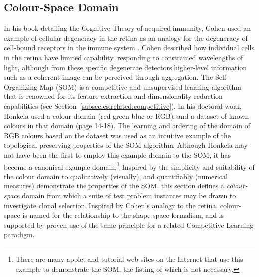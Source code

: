 \subsection{Colour-Space Domain}
\label{subsec:cells:paradigm:colourspace}
In his book detailing the Cognitive Theory of acquired immunity, Cohen used an example of cellular degeneracy in the retina as an analogy for the degeneracy of cell-bound receptors in the immune system \cite{Cohen2001a}. Cohen described how individual cells in the retina have limited capability, responding to constrained wavelengths of light, although from these specific degenerate detectors higher-level information such as a coherent image can be perceived through aggregation. The Self-Organizing Map (SOM) is a competitive and unsupervised learning algorithm that is renowned for its feature extraction and dimensionality reduction capabilities (see Section~\ref{subsec:cs:related:competitive}). In his doctoral work, Honkela used a colour domain (red-green-blue or RGB), and a dataset of known colours in that domain \cite{Honkela1997} (page 14-18). The learning and ordering of the domain of RGB colours based on the dataset was used as an intuitive example of the topological preserving properties of the SOM algorithm. Although Honkela may not have been the first to employ this example domain to the SOM, it has become a canonical example domain.\footnote{There are many applet and tutorial web sites on the Internet that use this example to demonstrate the SOM, the listing of which is not necessary.} Inspired by the simplicity and suitability of the colour domain to qualitatively (visually), and quantifiably (numerical measures) demonstrate the properties of the SOM, this section defines a \emph{colour-space} domain from which a suite of test problem instances may be drawn to investigate clonal selection. Inspired by Cohen's analogy to the retina, colour-space is named for the relationship to the shape-space formalism, and is supported by proven use of the same principle for a related Competitive Learning paradigm.

%
%
